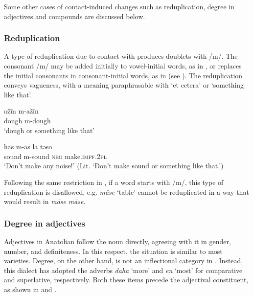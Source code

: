\documentclass[output=paper]{langsci/langscibook}
\begin{document}
Some other cases of contact-induced changes such as {reduplication}, degree in adjectives and {compounds} are discussed below.



\subsubsection{Reduplication}

A type of {reduplication} due to contact with  produces doublets with /m/. The consonant /m/ may be added initially to vowel-initial words, as in , or replaces the initial consonants in consonant-initial words, as in  (see \citealt{Akkus2017,Lahdo2009}). The {reduplication} conveys vagueness, with a meaning paraphrasable with `et cetera' or `something like that'.

\ea\label{redup}  
		\ea \label{redup1}\gll a\v{z}\={i}n m-a\v{z}\={i}n\\
        dough m-dough\\
        \glt `dough or something like that'


	\ex \label{redup2} \gll h\={a}s m-\={a}s l\={a} təso \\
        sound m-sound \textsc{neg} make.\textsc{impf.2pl}\\
        \glt `Don't make any noise!' (Lit. `Don't make sound or something like that.') %
\z
\z

\noindent Following the same restriction in , if a word starts with /m/, this type of {reduplication} is disallowed, e.g. \textit{m\={a}se} `table' cannot be reduplicated in a way that would result in \textit{m\={a}se} \textit{m\={a}se}.


\subsubsection{Degree in adjectives}
Adjectives in Anatolian  follow the noun directly, agreeing with it in {gender}, number, and {definiteness}. In this respect, the situation is similar to most  varieties. Degree, on the other hand, is not an {inflectional} category in  . Instead, this dialect has adopted the  adverbs \textit{daha} `more' and \textit{en} `most' for {comparative} and {superlative}, respectively. Both these items precede the adjectival constituent, as shown in  and .
\end{document}
